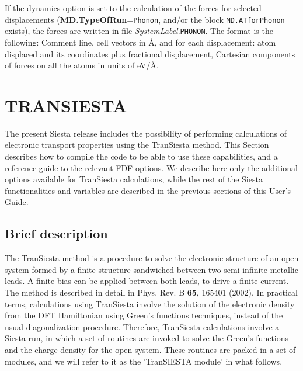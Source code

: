 \documentclass[11pt]{article}
\begin{document}
If the dynamics option is set to the calculation of the forces for
selected displacements ({\bf MD.TypeOfRun}={\tt Phonon}, and/or the
block {\tt MD.ATforPhonon} exists), the forces
are written in file {\it SystemLabel}.{\tt PHONON}.  The format is the
following: Comment line, cell vectors in {\AA}, and for each
displacement: atom displaced and its coordinates plus fractional
displacement, Cartesian components of forces on all the atoms in units
of eV/\AA.

\section{TRANSIESTA}

The present {\sc Siesta} release includes the possibility of
performing calculations of electronic transport properties using the
{\sc TranSiesta} method. This Section describes how to compile the
code to be able to use these capabilities, and a reference guide to
the relevant FDF options. We describe here only the additional options
available for TranSiesta calculations, while the rest of the Siesta
functionalities and variables are described in the previous sections
of this User's Guide.

\subsection{Brief description}

The {\sc TranSiesta} method is a procedure to solve the electronic
structure of an open system formed by a finite structure sandwiched
between two semi-infinite metallic leads. A finite bias can be applied
between both leads, to drive a finite current. The method is described
in detail in Phys. Rev. B {\bf 65}, 165401 (2002). In practical terms,
calculations using {\sc TranSiesta} involve the solution of the
electronic density from the DFT Hamiltonian using Green's functions
techniques, instead of the usual diagonalization procedure. Therefore,
{\sc TranSiesta} calculations involve a {\sc Siesta} run, in which a
set of routines are invoked to solve the Green's functions and the
charge density for the open system. These routines are packed in a set
of modules, and we will refer to it as the '{\sc TranSIESTA} module'
in what follows.
\end{document}
